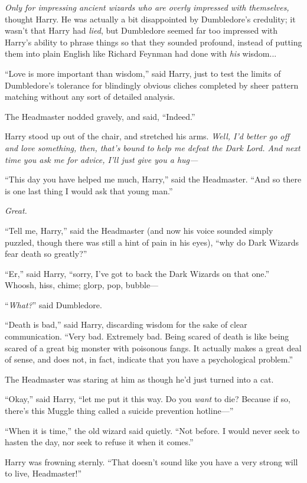 \emph{Only for impressing ancient wizards who are overly impressed with themselves,} thought Harry. He was actually a bit disappointed by Dumbledore’s credulity; it wasn’t that Harry had \emph{lied}, but Dumbledore seemed far too impressed with Harry’s ability to phrase things so that they sounded profound, instead of putting them into plain English like Richard Feynman had done with \emph{his} wisdom...

“Love is more important than wisdom,” said Harry, just to test the limits of Dumbledore’s tolerance for blindingly obvious cliches completed by sheer pattern matching without any sort of detailed analysis.

The Headmaster nodded gravely, and said, “Indeed.”

Harry stood up out of the chair, and stretched his arms. \emph{Well, I’d better go off and love something, then, that’s bound to help me defeat the Dark Lord. And next time you ask me for advice, I’ll just give you a hug—}

“This day you have helped me much, Harry,” said the Headmaster. “And so there is one last thing I would ask that young man.”

\emph{Great.}

“Tell me, Harry,” said the Headmaster (and now his voice sounded simply puzzled, though there was still a hint of pain in his eyes), “why do Dark Wizards fear death so greatly?”

“Er,” said Harry, “sorry, I’ve got to back the Dark Wizards on that one.”
\sbreak
Whoosh, hiss, chime; glorp, pop, bubble—

“\emph{What?}” said Dumbledore.

“Death is bad,” said Harry, discarding wisdom for the sake of clear communication. “Very bad. Extremely bad. Being scared of death is like being scared of a great big monster with poisonous fangs. It actually makes a great deal of sense, and does not, in fact, indicate that you have a psychological problem.”

The Headmaster was staring at him as though he’d just turned into a cat.

“Okay,” said Harry, “let me put it this way. Do you \emph{want} to die? Because if so, there’s this Muggle thing called a suicide prevention hotline—”

“When it is time,” the old wizard said quietly. “Not before. I would never seek to hasten the day, nor seek to refuse it when it comes.”

Harry was frowning sternly. “That doesn’t sound like you have a very strong will to live, Headmaster!”

